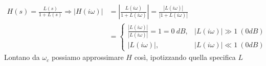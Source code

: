 \documentclass[10pt,a4paper]{book}
\begin{document}
\begin{equation*}
	\begin{aligned}
		H(s) =\frac{L(s)}{1+L(s)} \Rightarrow | H(i\omega)|  & =\left| \frac{L(i\omega)}{1+L(i\omega)}\right| =\frac{| L(i\omega)| }{| 1+L(i\omega)| } \\
		                                                     & =\begin{cases}                                                                          
		\frac{| L(i\omega)| }{| L(i\omega)| } =1=0\ \si{dB}, & | L(i\omega)| \gg 1\ (0 \si{dB})                                                        \\
		| L(i\omega)| ,                                      & | L(i\omega)| \ll 1\ (0 \si{dB})                                                        
		\end{cases}
	\end{aligned}
\end{equation*}
Lontano da $\omega _c$ possiamo approssimare $H$ così, ipotizzando quella specifica $L$
\end{document}
